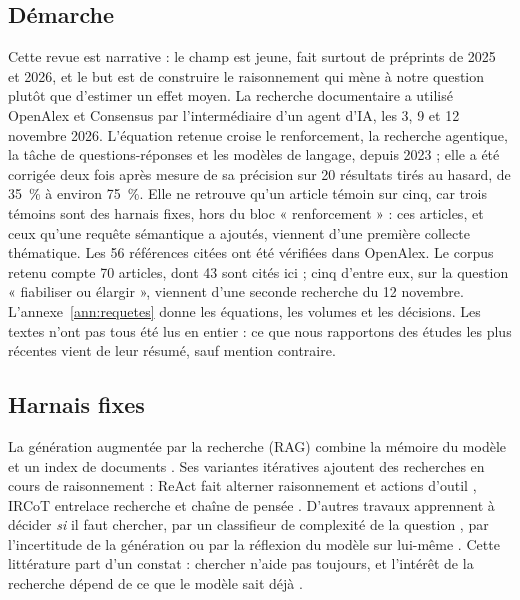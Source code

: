\subsection{Démarche}
Cette revue est narrative : le champ est jeune, fait surtout de préprints de 2025 et 2026, et le but est de construire le raisonnement qui mène à notre question plutôt que d'estimer un effet moyen. La recherche documentaire a utilisé OpenAlex et Consensus par l'intermédiaire d'un agent d'IA, les 3, 9 et 12 novembre 2026. L'équation retenue croise le renforcement, la recherche agentique, la tâche de questions-réponses et les modèles de langage, depuis 2023 ; elle a été corrigée deux fois après mesure de sa précision sur 20 résultats tirés au hasard, de 35~\% à environ 75~\%. Elle ne retrouve qu'un article témoin sur cinq, car trois témoins sont des harnais fixes, hors du bloc « renforcement » : ces articles, et ceux qu'une requête sémantique a ajoutés, viennent d'une première collecte thématique. Les 56 références citées ont été vérifiées dans OpenAlex. Le corpus retenu compte 70 articles, dont 43 sont cités ici ; cinq d'entre eux, sur la question « fiabiliser ou élargir », viennent d'une seconde recherche du 12 novembre. L'annexe~\ref{ann:requetes} donne les équations, les volumes et les décisions. Les textes n'ont pas tous été lus en entier : ce que nous rapportons des études les plus récentes vient de leur résumé, sauf mention contraire.

\subsection{Harnais fixes}
La génération augmentée par la recherche (RAG) combine la mémoire du modèle et un index de documents \citep{lewis2020retrieval}. Ses variantes itératives ajoutent des recherches en cours de raisonnement : ReAct fait alterner raisonnement et actions d'outil \citep{yao2022react}, IRCoT entrelace recherche et chaîne de pensée \citep{trivedi2022interleaving}. D'autres travaux apprennent à décider \emph{si} il faut chercher, par un classifieur de complexité de la question \citep{jeong2024adaptive}, par l'incertitude de la génération \citep{jiang2023active,moskvoretskii2025adaptive} ou par la réflexion du modèle sur lui-même \citep{asai2023self}. Cette littérature part d'un constat : chercher n'aide pas toujours, et l'intérêt de la recherche dépend de ce que le modèle sait déjà \citep{mallen2022when,yin2023do}.

